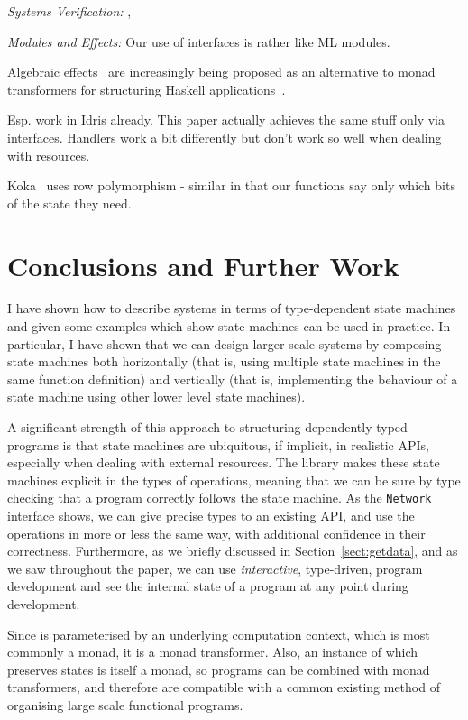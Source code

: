 \emph{\textsf{Systems Verification:}}
%
\citep{Chlipala2015}, \citep{klein2009sel4}


\emph{\textsf{Modules and Effects:}}
%
Our use of interfaces is rather like ML modules.

Algebraic effects~\citep{Plotkin2009,Bauer} are increasingly being proposed as
an alternative to monad transformers for structuring Haskell
applications~\citep{KiselyovEffects,handlers2013}.

Esp. work in Idris already. This paper actually achieves the same stuff
only via interfaces. Handlers work a bit differently but don't work so well
when dealing with resources.

Koka~\cite{Leijen2017} uses row polymorphism - similar in that our functions
say only which bits of the state they need.

\section{Conclusions and Further Work}

I have shown how to describe systems in terms of type-dependent state machines
and given some examples which show state machines can be used in practice.  In
particular, I have shown that we can design larger scale systems by composing
state machines both horizontally (that is, using multiple state machines in the
same function definition) and vertically (that is, implementing the behaviour
of a state machine using other lower level state machines). 

A significant strength of this approach to structuring dependently typed
programs is that state machines are ubiquitous, if implicit, in realistic APIs,
especially when dealing with external resources. The \states{} library makes
these state machines explicit in the types of operations, meaning that we can
be sure by type checking that a program correctly follows the state machine.
As the \texttt{Network} interface shows, we can give precise types to an existing
API, and use the operations in more or less the same way, with
additional confidence in their correctness.
%
Furthermore, as we briefly discussed in Section~\ref{sect:getdata}, and
as we saw throughout the paper, we can use
\emph{interactive}, type-driven, program development and see the internal state
of a program at any point during development.

Since \states{} is parameterised by an underlying computation context, which
is most commonly a monad, it is a monad transformer.  Also, an instance
of \states{}
which preserves states is itself a monad, so \states{} programs can be combined
with monad transformers, and therefore are compatible with a
common existing method of organising large scale functional programs.

